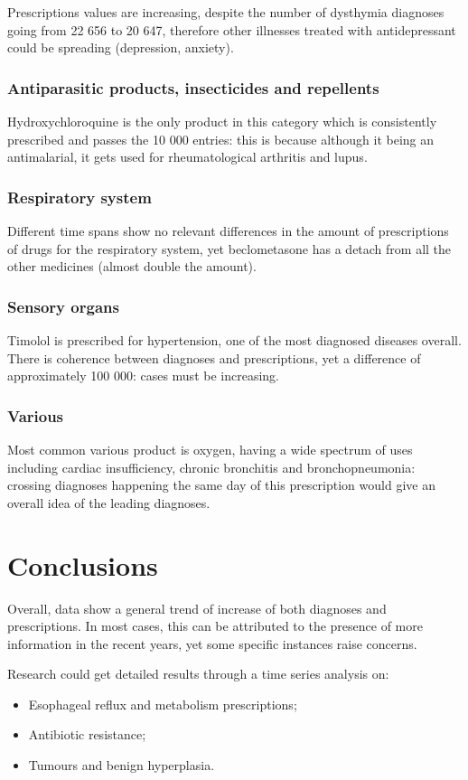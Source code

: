 Prescriptions values are increasing, despite the number of dysthymia diagnoses going from 22 656 to 20 647, therefore other illnesses treated with antidepressant could be spreading (depression, anxiety).

\subsubsection{Antiparasitic products, insecticides and repellents}
Hydroxychloroquine is the only product in this category which is consistently prescribed and passes the 10 000 entries: this is because although it being an antimalarial, it gets used for rheumatological arthritis and lupus.

\subsubsection{Respiratory system}
Different time spans show no relevant differences in the amount of prescriptions of drugs for the respiratory system, yet beclometasone has a detach from all the other medicines (almost double the amount).

\subsubsection{Sensory organs}
Timolol is prescribed for hypertension, one of the most diagnosed diseases overall. There is coherence between diagnoses and prescriptions, yet a difference of approximately 100 000: cases must be increasing.

\subsubsection{Various}
Most common various product is oxygen, having a wide spectrum of uses including cardiac insufficiency, chronic bronchitis and bronchopneumonia: crossing diagnoses happening the same day of this prescription would give an overall idea of the leading diagnoses.

\section{Conclusions}
Overall, data show a general trend of increase of both diagnoses and prescriptions. In most cases, this can be attributed to the presence of more information in the recent years, yet some specific instances raise concerns.

Research could get detailed results through a time series analysis on:
\begin{itemize}
	\item Esophageal reflux and metabolism prescriptions;
	\item Antibiotic resistance;
	\item Tumours and benign hyperplasia. 
\end{itemize}





